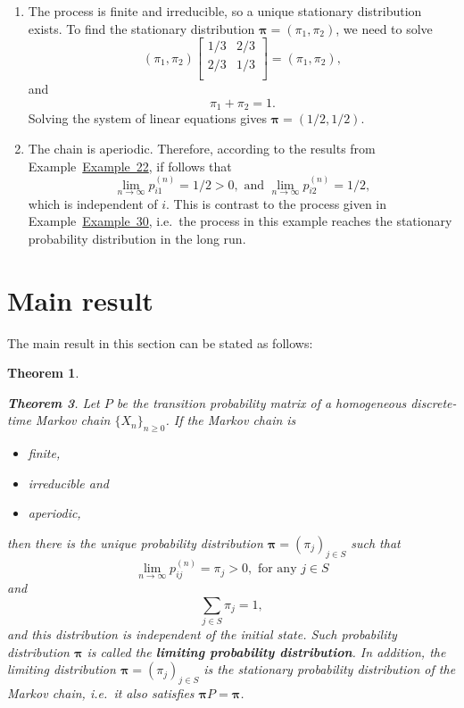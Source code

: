 \documentclass[
]{book}
\newtheorem{theorem}{Theorem}[chapter]
\theoremstyle{definition}
\theoremstyle{definition}
\theoremstyle{definition}
\theoremstyle{definition}
\theoremstyle{remark}
\begin{document}
\begin{enumerate}
\def\labelenumi{\arabic{enumi}.}
\item
  The process is finite and irreducible, so a unique stationary
  distribution exists. To find the stationary distribution
  \(\boldsymbol{\pi} = (\pi_{1}, \pi_{2})\), we need to solve
  \[\left(\pi_{1},  \pi_{2}\right) \begin{bmatrix}
      1/3 & 2/3   \\
      2/3 & 1/3   \\
  \end{bmatrix} = \left(\pi_{1},  \pi_{2}\right),\] and
  \[\pi_{1} +  \pi_{2}  = 1.\] Solving the system of linear equations
  gives \(\boldsymbol{\pi} = (1/2, 1/2).\)
\item
  The chain is aperiodic. Therefore, according to the results from
  Example~\protect\hyperlink{exampleStationary}{Example~22}, if follows that
  \[\lim_{n \rightarrow \infty} p_{i1}^{(n)} = 1/2 > 0 , \text{ and }  \lim_{n \rightarrow \infty} p_{i2}^{(n)} = 1/2,\]
  which is independent of \(i\). This is contrast to the process given
  in Example~\protect\hyperlink{exampleLongTerm}{Example~30}, i.e.~the process in this example
  reaches the stationary probability distribution in the long run.
\end{enumerate}

\hypertarget{main-result}{%
\section*{Main result}\label{main-result}}

The main result in this section can be stated as follows:

\begin{theorem}
\protect\hypertarget{thm:unlabeled-div-33}{}\label{thm:unlabeled-div-33}

\textbf{Theorem 3}. \emph{Let \(P\) be the transition probability matrix of a
homogeneous discrete-time Markov chain \(\{X_n \}_{n \ge 0}\). If the
Markov chain is}

\begin{itemize}
\item
  \emph{finite,}
\item
  \emph{irreducible and}
\item
  \emph{aperiodic,}
\end{itemize}

\emph{then there is the unique probability distribution
\(\boldsymbol{\pi} = (\pi_j)_{j\in S}\) such that
\[\lim_{n \rightarrow \infty} p^{(n)}_{ij} = \pi_j > 0, \text{ for any } j \in S\]
and \[\sum_{j \in S} \pi_j = 1,\] and this distribution is independent
of the initial state. Such probability distribution \(\boldsymbol{\pi}\)
is called the \textbf{limiting probability distribution}. In addition, the
limiting distribution \(\boldsymbol{\pi} = (\pi_j)_{j\in S}\) is the
stationary probability distribution of the Markov chain, i.e.~it also
satisfies \(\boldsymbol{\pi} P =\boldsymbol{\pi}\).}

\end{theorem}
\end{document}
